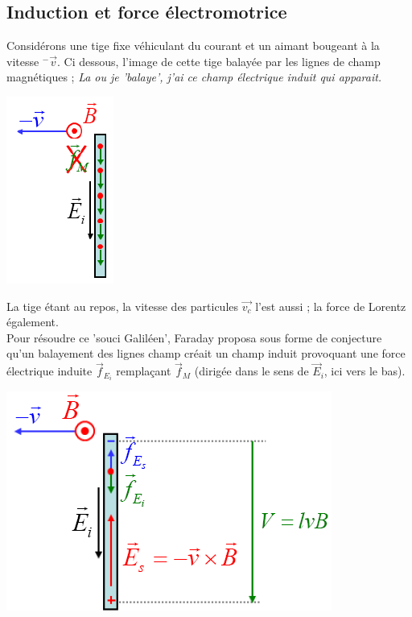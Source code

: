 \documentclass	[11pt, a4paper, openany]{book}
\begin{document}
\subsection{Induction et force électromotrice}
Considérons une tige fixe véhiculant du courant et un aimant bougeant à la vitesse $^-\vec{v}$. Ci dessous, l'image de cette tige balayée par les lignes de champ magnétiques ; \textit{La ou je 'balaye', j'ai ce champ électrique induit qui apparait.}
\begin{center}
\includegraphics[scale=0.35]{em/image3.png}\\
\end{center}
La tige étant au repos, la vitesse des particules $\vec{v_c}$ l'est aussi ; la force de Lorentz également. \\

Pour résoudre ce 'souci Galiléen', Faraday proposa sous forme de conjecture qu'un balayement des lignes champ créait un champ induit provoquant une force électrique induite $\vec{f}_{E_i}$ remplaçant $\vec{f}_M$ (dirigée dans le sens de $\vec{E}_i$, ici vers le bas).
\begin{center}
\includegraphics[scale=0.45]{em/image4.png}\\
\end{center}
\end{document}
